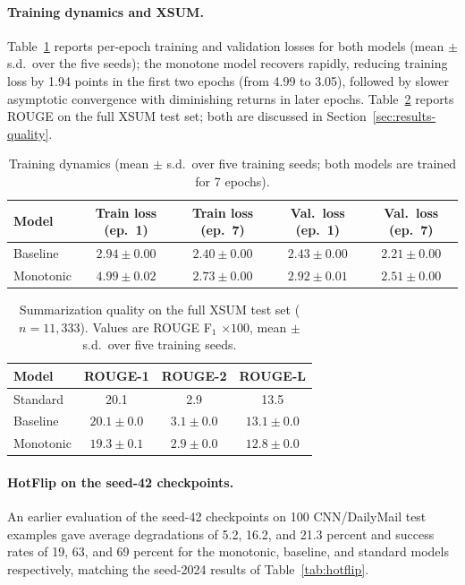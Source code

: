 \documentclass{article}
\theoremstyle{plain}
\theoremstyle{definition}
\theoremstyle{remark}
\theoremstyle{plain}
\begin{document}
\paragraph{Training dynamics and XSUM.} Table~\ref{tab:training} reports per-epoch training and validation losses for both models (mean $\pm$ s.d.\ over the five seeds); the monotone model recovers rapidly, reducing training loss by 1.94 points in the first two epochs (from 4.99 to 3.05), followed by slower asymptotic convergence with diminishing returns in later epochs. Table~\ref{tab:xsum} reports ROUGE on the full XSUM test set; both are discussed in Section~\ref{sec:results-quality}.
\begin{table}[t]
\caption{Training dynamics (mean $\pm$ s.d.\ over five training seeds; both models are trained for 7 epochs).}
\label{tab:training}
\vskip 0.1in
\begin{center}
\begin{small}
\begin{tabular}{lcccc}
\toprule
Model & Train loss (ep.\ 1) & Train loss (ep.\ 7) & Val.\ loss (ep.\ 1) & Val.\ loss (ep.\ 7) \\
\midrule
Baseline  & $2.94 \pm 0.00$ & $2.40 \pm 0.00$ & $2.43 \pm 0.00$ & $2.21 \pm 0.00$ \\
Monotonic & $4.99 \pm 0.02$ & $2.73 \pm 0.00$ & $2.92 \pm 0.01$ & $2.51 \pm 0.00$ \\
\bottomrule
\end{tabular}
\end{small}
\end{center}
\vskip -0.1in
\end{table}
\begin{table}[t]
\caption{Summarization quality on the full XSUM test set ($n = 11{,}333$). Values are ROUGE F$_1$ $\times 100$, mean $\pm$ s.d.\ over five training seeds.}
\label{tab:xsum}
\vskip 0.1in
\centering\footnotesize
\begin{tabular}{lccc}
\toprule
Model & ROUGE-1 & ROUGE-2 & ROUGE-L \\
\midrule
Standard  & 20.1 & 2.9 & 13.5 \\
Baseline  & $20.1 \pm 0.0$ & $3.1 \pm 0.0$ & $13.1 \pm 0.0$ \\
Monotonic & $19.3 \pm 0.1$ & $2.9 \pm 0.0$ & $12.8 \pm 0.0$ \\
\bottomrule
\end{tabular}
\vskip -0.1in
\end{table}

\paragraph{HotFlip on the seed-42 checkpoints.} An earlier evaluation of the seed-42 checkpoints on 100 CNN/DailyMail test examples gave average degradations of 5.2, 16.2, and 21.3 percent and success rates of 19, 63, and 69 percent for the monotonic, baseline, and standard models respectively, matching the seed-2024 results of Table~\ref{tab:hotflip}.
\end{document}
